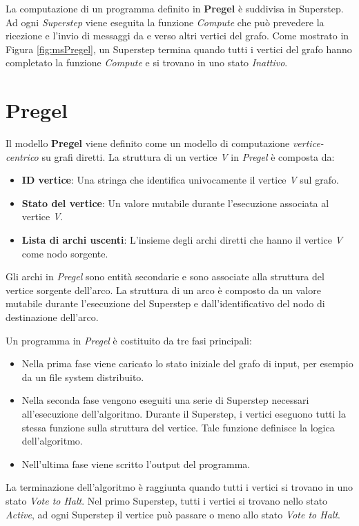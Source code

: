 \documentclass[LaM,binding=0.6cm]{sapthesis}
\begin{document}
La computazione di un programma definito in \textbf{Pregel} \cite{Malewicz:2010:PSL:1807167.1807184} è suddivisa in Superstep. Ad ogni \textit{Superstep} viene eseguita la funzione \textit{Compute} che può prevedere la ricezione e l'invio di messaggi da e verso altri vertici del grafo. Come mostrato in Figura \ref{fig:msPregel}, un Superstep termina quando tutti i vertici del grafo hanno completato la funzione \textit{Compute} e si trovano in uno stato \textit{Inattivo}.

\section{Pregel}

Il modello \textbf{Pregel} viene definito come un modello di computazione \textit{vertice-centrico} su grafi diretti. 
La struttura di un vertice \textit{V} in \textit{Pregel} è composta da:
\begin{itemize}
\item \textbf{ID vertice}: Una stringa che identifica univocamente il vertice \textit{V} sul grafo.
\item \textbf{Stato del vertice}: Un valore mutabile durante l'esecuzione associata al vertice \textit{V}.
\item \textbf{Lista di archi uscenti}: L'insieme degli archi diretti che hanno il vertice \textit{V} come nodo sorgente.
\end{itemize}
Gli archi in \textit{Pregel} sono entità secondarie e sono associate alla struttura del vertice sorgente dell'arco. La struttura di un arco è composto da un valore mutabile durante l'esecuzione del Superstep e dall'identificativo del nodo di destinazione dell'arco.

Un programma  in \textit{Pregel} è costituito da tre fasi principali: 
\begin{itemize}

\item Nella prima fase viene caricato lo stato iniziale del grafo di input, per esempio da un file system distribuito. 
\item Nella seconda fase vengono eseguiti una serie di Superstep necessari all'esecuzione dell'algoritmo. Durante il Superstep, i vertici eseguono tutti la stessa funzione sulla struttura del vertice. Tale funzione definisce la logica dell'algoritmo.
\item Nell'ultima fase viene scritto l’output del programma. 
\end{itemize}
La terminazione dell'algoritmo è raggiunta quando tutti i vertici si trovano in uno stato \textit{Vote to Halt}. Nel primo Superstep, tutti i vertici si trovano nello stato \textit{Active}, ad ogni Superstep il vertice può  passare o meno allo stato \textit{Vote to Halt}.
\end{document}
